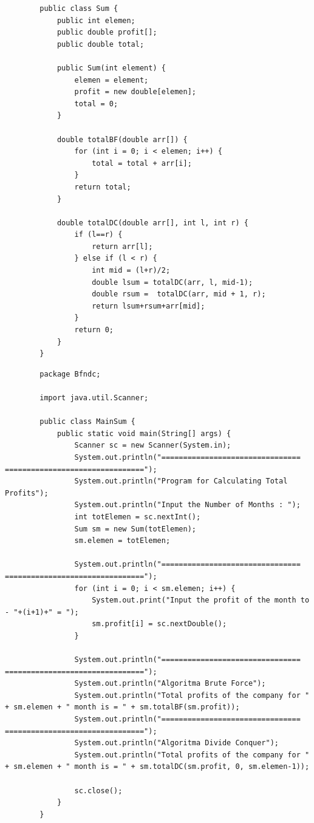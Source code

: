 \documentclass[12pt,titlepage]{article}
\begin{document}
\begin{enumerate}
\begin{verbatim}
        public class Sum {
            public int elemen;
            public double profit[];
            public double total;

            public Sum(int element) {
                elemen = element;
                profit = new double[elemen];
                total = 0;
            }

            double totalBF(double arr[]) {
                for (int i = 0; i < elemen; i++) {
                    total = total + arr[i];
                }
                return total;
            }

            double totalDC(double arr[], int l, int r) {
                if (l==r) {
                    return arr[l];
                } else if (l < r) {
                    int mid = (l+r)/2;
                    double lsum = totalDC(arr, l, mid-1);
                    double rsum =  totalDC(arr, mid + 1, r);
                    return lsum+rsum+arr[mid];
                }
                return 0;
            }
        }
    \end{verbatim}
    \begin{verbatim}
        package Bfndc;

        import java.util.Scanner;

        public class MainSum {
            public static void main(String[] args) {
                Scanner sc = new Scanner(System.in);
                System.out.println("================================ ================================");
                System.out.println("Program for Calculating Total Profits");
                System.out.println("Input the Number of Months : ");
                int totElemen = sc.nextInt();
                Sum sm = new Sum(totElemen);
                sm.elemen = totElemen;
                
                System.out.println("================================ ================================");
                for (int i = 0; i < sm.elemen; i++) {
                    System.out.print("Input the profit of the month to - "+(i+1)+" = ");
                    sm.profit[i] = sc.nextDouble();
                }

                System.out.println("================================ ================================");
                System.out.println("Algoritma Brute Force");
                System.out.println("Total profits of the company for " + sm.elemen + " month is = " + sm.totalBF(sm.profit));
                System.out.println("================================ ================================");
                System.out.println("Algoritma Divide Conquer");
                System.out.println("Total profits of the company for " + sm.elemen + " month is = " + sm.totalDC(sm.profit, 0, sm.elemen-1));
                
                sc.close();
            }
        }

    \end{verbatim}
\end{enumerate}
\end{document}
